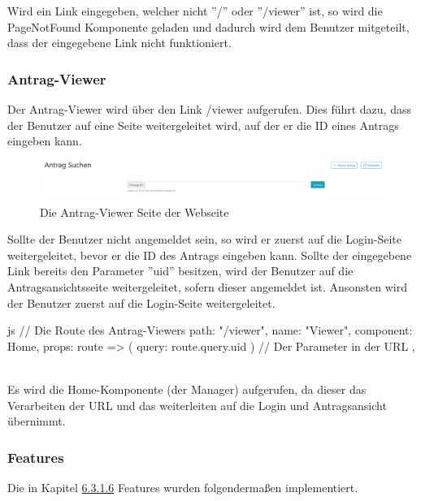 Wird ein Link eingegeben, welcher nicht ''/'' oder ''/viewer'' ist, so wird die PageNotFound Komponente geladen und dadurch wird dem Benutzer mitgeteilt, dass der eingegebene Link nicht funktioniert.
\subsubsection{Antrag-Viewer}
Der Antrag-Viewer wird über den Link /viewer aufgerufen. Dies führt dazu, dass der Benutzer auf eine Seite weitergeleitet wird, auf der er die ID eines Antrags eingeben kann.
\begin{figure}[H]
	\centering
	\includegraphics[width=1\linewidth]{images/antrag_viewer}
	\caption[Webseite Antrag-Viewer]{Die Antrag-Viewer Seite der Webseite}
	\label{fig:antragviewer}
\end{figure}

Sollte der Benutzer nicht angemeldet sein, so wird er zuerst auf die Login-Seite weitergeleitet, bevor er die ID des Antrags eingeben kann. Sollte der eingegebene Link bereits den Parameter ''uid'' besitzen, wird der Benutzer auf die Antragsansichtsseite weitergeleitet, sofern dieser angemeldet ist. Ansonsten wird der Benutzer zuerst auf die Login-Seite weitergeleitet.
\begin{code}{js}
	{
		// Die Route des Antrag-Viewers
		path: "/viewer",
		name: "Viewer",
		component: Home,
		props: route => ({ query: route.query.uid }) // Der Parameter in der URL
	},
\end{code}
~\\
Es wird die Home-Komponente (der Manager) aufgerufen, da dieser das Verarbeiten der URL und das weiterleiten auf die Login und Antragsansicht übernimmt.
\newpage
\subsubsection{Features}
Die in Kapitel \hyperref[sec:feature]{6.3.1.6} Features wurden folgendermaßen implementiert.


